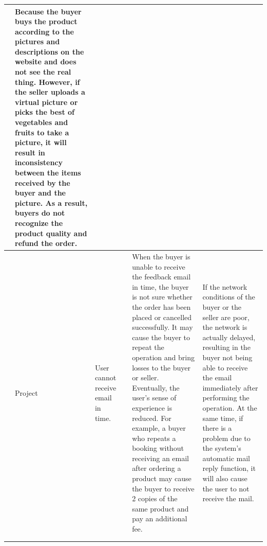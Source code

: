 \documentclass{report}
\begin{document}
\begin{tabularx}{0.95\linewidth}{%
  >{\raggedright\arraybackslash}p{1cm}%
  l%
  >{\raggedright\arraybackslash}p{2cm}%
  l
  >{\raggedright\arraybackslash}X%
  >{\raggedright\arraybackslash}X}
  & Because the buyer buys the product according to the pictures and descriptions on the website and does not see the real thing. However, if the seller uploads a virtual picture or picks the best of vegetables and fruits to take a picture, it will result in inconsistency between the items received by the buyer and the picture. As a result, buyers do not recognize the product quality and refund the order.
  \\
  \midrule
  5
  & Project
  & User cannot receive email in time.
  &
  & When the buyer is unable to receive the feedback email in time, the buyer is not sure whether the order has been placed or cancelled successfully. It may cause the buyer to repeat the operation and bring losses to the buyer or seller. Eventually, the user's sense of experience is reduced. For example, a buyer who repeats a booking without receiving an email after ordering a product may cause the buyer to receive 2 copies of the same product and pay an additional fee.
  & If the network conditions of the buyer or the seller are poor, the network is actually delayed, resulting in the buyer not being able to receive the email immediately after performing the operation. At the same time, if there is a problem due to the system's automatic mail reply function, it will also cause the user to not receive the mail.
  \\
  \bottomrule
  \\
  \caption{Risk Impact Analysis Table}  
  \label{tab:riskImpactAnalysisTable}
\end{tabularx}

\clearpage
\end{document}
